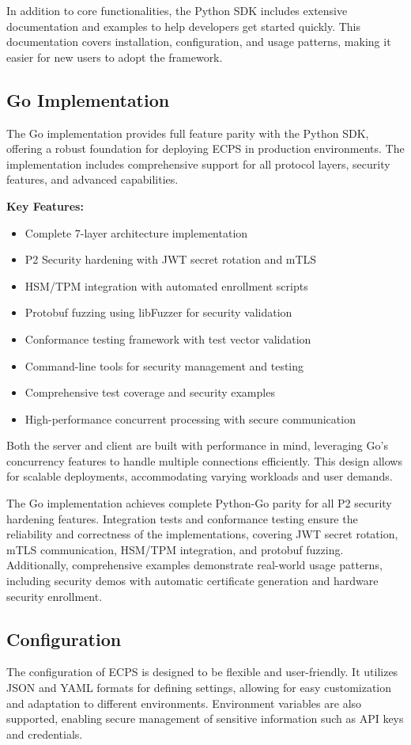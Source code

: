 \documentclass[12pt]{article}
\begin{document}
In addition to core functionalities, the Python SDK includes extensive documentation and examples to help developers get started quickly. This documentation covers installation, configuration, and usage patterns, making it easier for new users to adopt the framework.

\subsection{Go Implementation}
The Go implementation provides full feature parity with the Python SDK, offering a robust foundation for deploying ECPS in production environments. The implementation includes comprehensive support for all protocol layers, security features, and advanced capabilities.

\textbf{Key Features:}
\begin{itemize}
  \item Complete 7-layer architecture implementation
  \item P2 Security hardening with JWT secret rotation and mTLS
  \item HSM/TPM integration with automated enrollment scripts
  \item Protobuf fuzzing using libFuzzer for security validation
  \item Conformance testing framework with test vector validation
  \item Command-line tools for security management and testing
  \item Comprehensive test coverage and security examples
  \item High-performance concurrent processing with secure communication
\end{itemize}

Both the server and client are built with performance in mind, leveraging Go's concurrency features to handle multiple connections efficiently. This design allows for scalable deployments, accommodating varying workloads and user demands.

The Go implementation achieves complete Python-Go parity for all P2 security hardening features. Integration tests and conformance testing ensure the reliability and correctness of the implementations, covering JWT secret rotation, mTLS communication, HSM/TPM integration, and protobuf fuzzing. Additionally, comprehensive examples demonstrate real-world usage patterns, including security demos with automatic certificate generation and hardware security enrollment.

\subsection{Configuration}
The configuration of ECPS is designed to be flexible and user-friendly. It utilizes JSON and YAML formats for defining settings, allowing for easy customization and adaptation to different environments. Environment variables are also supported, enabling secure management of sensitive information such as API keys and credentials.
\end{document}
